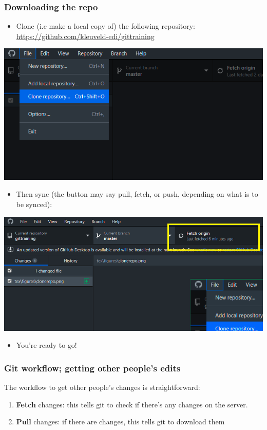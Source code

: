 \documentclass{beamer}
\begin{document}
\begin{frame}
\frametitle{Downloading the repo}
	\begin{itemize}
			\item Clone (i.e make a local copy of) the following repository: \url{https://github.com/kleuveld-edi/gittraining}
	\end{itemize}
	\hfill\includegraphics[width=0.5\linewidth]{figures/clonerepo.png}\hfill\strut
	\begin{itemize}
			\item Then sync (the button may say pull, fetch, or push, depending on what is to be synced):
	\end{itemize}
	\hfill\includegraphics[width=0.5\linewidth]{figures/fetch.png}\hfill\strut
	\begin{itemize}
			\item You're ready to go!
	\end{itemize}
\end{frame}

\begin{frame}
	\frametitle{Git workflow; getting other people's edits}
	The workflow to get other people's changes is straightforward:
	\begin{enumerate}
		\item<2-> \textbf{Fetch} changes: this tells git to check if there's any changes on the server.
		\item<2-> \textbf{Pull} changes: if there are changes, this tells git to download them
	\end{enumerate}
\end{frame}

\end{document}
